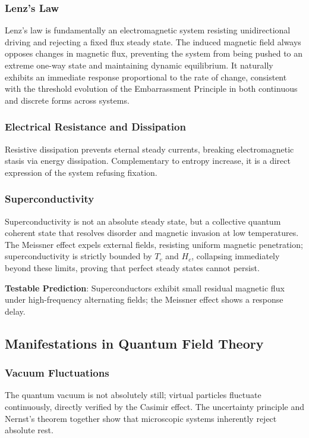 \documentclass[10pt,a4paper]{article}
\begin{document}
\subsubsection{Lenz’s Law}
Lenz’s law is fundamentally an electromagnetic system resisting unidirectional driving and rejecting a fixed flux steady state. The induced magnetic field always opposes changes in magnetic flux, preventing the system from being pushed to an extreme one-way state and maintaining dynamic equilibrium. It naturally exhibits an immediate response proportional to the rate of change, consistent with the threshold evolution of the Embarrassment Principle in both continuous and discrete forms across systems.

\subsubsection{Electrical Resistance and Dissipation}
Resistive dissipation prevents eternal steady currents, breaking electromagnetic stasis via energy dissipation. Complementary to entropy increase, it is a direct expression of the system refusing fixation.

\subsubsection{Superconductivity}
Superconductivity is not an absolute steady state, but a collective quantum coherent state that resolves disorder and magnetic invasion at low temperatures. The Meissner effect expels external fields, resisting uniform magnetic penetration; superconductivity is strictly bounded by $T_c$ and $H_c$, collapsing immediately beyond these limits, proving that perfect steady states cannot persist.

\textbf{Testable Prediction}: Superconductors exhibit small residual magnetic flux under high-frequency alternating fields; the Meissner effect shows a response delay.

\subsection{Manifestations in Quantum Field Theory}

\subsubsection{Vacuum Fluctuations}
The quantum vacuum is not absolutely still; virtual particles fluctuate continuously, directly verified by the Casimir effect. The uncertainty principle and Nernst’s theorem together show that microscopic systems inherently reject absolute rest.
\end{document}
